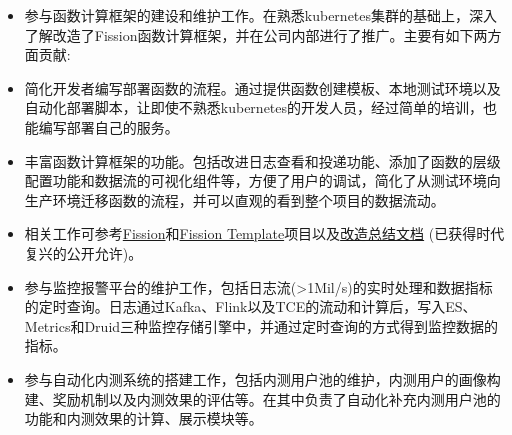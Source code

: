 \documentclass{resume}
\begin{document}
  \begin{itemize}[topsep = 0 pt, partopsep = 0pt]
    \item 参与函数计算框架的建设和维护工作。在熟悉kubernetes集群的基础上，深入了解改造了Fission函数计算框架，并在公司内部进行了推广。主要有如下两方面贡献:
    \item 简化开发者编写部署函数的流程。通过提供函数创建模板、本地测试环境以及自动化部署脚本，让即使不熟悉kubernetes的开发人员，经过简单的培训，也能编写部署自己的服务。
    \item 丰富函数计算框架的功能。包括改进日志查看和投递功能、添加了函数的层级配置功能和数据流的可视化组件等，方便了用户的调试，简化了从测试环境向生产环境迁移函数的流程，并可以直观的看到整个项目的数据流动。
    \item 相关工作可参考\href{https://github.com/jingtaozhang18/fission}{Fission}和\href{https://github.com/jingtaozhang18/fission-template}{Fission Template}项目以及\href{https://jingtao.fun/源码-Fission功能拓展/}{改造总结文档} (已获得时代复兴的公开允许)。
  \end{itemize}
  
  \begin{itemize}[topsep = 0 pt, partopsep = 0pt]
    \item 参与监控报警平台的维护工作，包括日志流(>1Mil/s)的实时处理和数据指标的定时查询。日志通过Kafka、Flink以及TCE的流动和计算后，写入ES、Metrics和Druid三种监控存储引擎中，并通过定时查询的方式得到监控数据的指标。
    \item 参与自动化内测系统的搭建工作，包括内测用户池的维护，内测用户的画像构建、奖励机制以及内测效果的评估等。在其中负责了自动化补充内测用户池的功能和内测效果的计算、展示模块等。
  \end{itemize}
  
\end{document}
